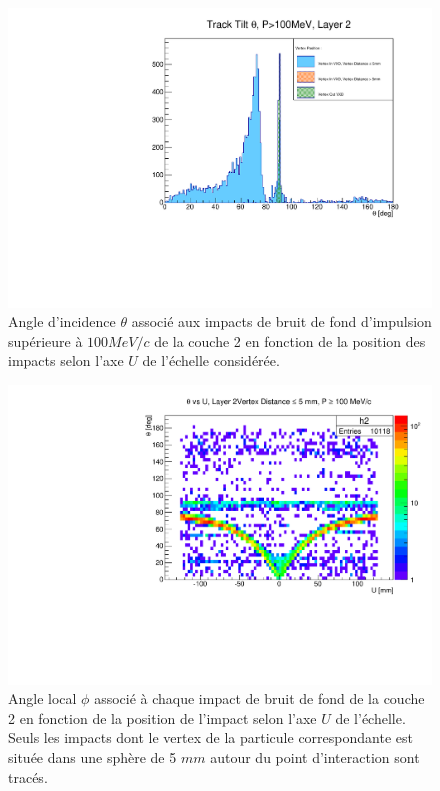 \begin{appendices}
  \begin{figure}[!htb]
    \centering
    \includegraphics[scale=0.58]{./figures/Track_Tilts_Beamstrahlung/beamstrahlung_Theta/Track_Tilts_Theta_P_sup_100MeV_Layer2.pdf}
    \caption{Angle d'incidence $\theta$ associ\'e aux impacts de bruit de fond d'impulsion sup\'erieure \`a $100 MeV/c$ de la couche 2 en fonction de la position des impacts selon l'axe $U$ de l'\'echelle consid\'er\'ee.}
    \label{fig:theta_Layer2_pT_sup_100MeV}
  \end{figure}
  
  \begin{figure}[!htb]
    \centering
    \includegraphics[scale=0.58]{./figures/Track_Tilts_Beamstrahlung/beamstrahlung_Theta/Track_Tilts_Theta_vs_U_P_sup_100MeV_vertex_inf_5mm_Layer2.pdf}
    \caption{Angle local $\phi$ associ\'e \`a chaque impact de bruit de fond de la couche 2 en fonction de la position de l'impact selon l'axe $U$ de l'\'echelle. Seuls les impacts dont le vertex de la particule correspondante est situ\'ee dans une sph\`ere de 5 $mm$ autour du point d'interaction sont trac\'es.}
    \label{fig:theta_Layer2_vs_U_P_sup_100MeV_vertex_inf_5mm}
  \end{figure}
  

\end{appendices}
